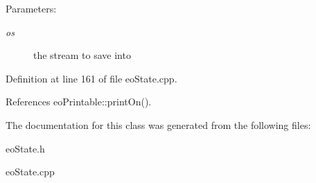 \begin{Desc}
\item[Parameters:]
\begin{description}
\item[{\em os}]the stream to save into \end{description}
\end{Desc}


Definition at line 161 of file eo\-State.cpp.

References eo\-Printable::print\-On().

The documentation for this class was generated from the following files:\begin{CompactItemize}
\item 
eo\-State.h\item 
eo\-State.cpp\end{CompactItemize}
